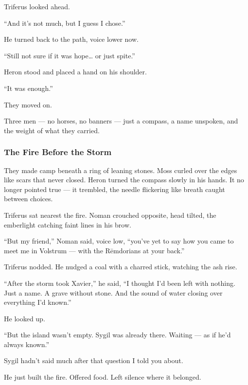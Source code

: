 \documentclass[12pt]{article}
\begin{document}
Triferus looked ahead.

“And it's not much, but I guess I chose.”

He turned back to the path, voice lower now.

“Still not sure if it was hope… or just spite.”

\vspace{1em}

Heron stood and placed a hand on his shoulder.

“It was enough.”

\vspace{1em}

They moved on.

Three men — no horses, no banners — just a compass, a name unspoken, and the weight of what they carried.

\dotfill

\subsubsection{The Fire Before the Storm}
They made camp beneath a ring of leaning stones. Moss curled over the edges like scars that never closed. Heron turned the compass slowly in his hands. It no longer pointed true — it trembled, the needle flickering like breath caught between choices.

Triferus sat nearest the fire. Noman crouched opposite, head tilted, the emberlight catching faint lines in his brow.

“But my friend,” Noman said, voice low, “you’ve yet to say how you came to meet me in Volstrum — with the Rēmdorians at your back.”

\vspace{1em}

Triferus nodded. He nudged a coal with a charred stick, watching the ash rise.

“After the storm took Xavier,” he said, “I thought I’d been left with nothing. Just a name. A grave without stone. And the sound of water closing over everything I’d known.”

He looked up.

“But the island wasn’t empty. Sygil was already there. Waiting — as if he’d always known.”

\vspace{1em}

Sygil hadn’t said much after that question I told you about.

He just built the fire. Offered food. Left silence where it belonged.
\end{document}
